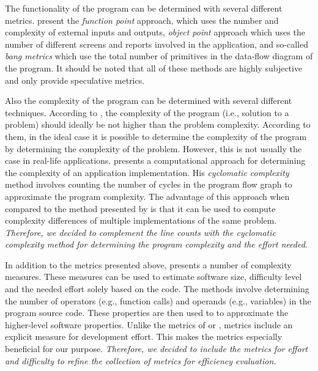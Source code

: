 The functionality of the program can be determined with several different metrics. \citet{fenton_software_1998} present the \emph{function point} approach, which uses the number and complexity of external inputs and outputs, \emph{object point} approach which uses the number of different screens and reports involved in the application, and so-called \emph{bang metrics} which use the total number of primitives in the data-flow diagram of the program. It should be noted that all of these methods are highly subjective and only provide speculative metrics.

Also the complexity of the program can be determined with several different techniques. According to \citet{fenton_software_1998}, the complexity of the program (i.e., solution to a problem) should ideally be not higher than the problem complexity. According to them, in the ideal case it is possible to determine the complexity of the program by determining the complexity of the problem. However, this is not usually the case in real-life applications. \citet{mccabe_complexity_1976} presents a computational approach for determining the complexity of an application implementation. His \emph{cyclomatic complexity} method involves counting the number of cycles in the program flow graph to approximate the program complexity. The advantage of this approach when compared to the method presented by \citet{fenton_software_1998} is that it can be used to compute complexity differences of multiple implementations of the same problem. \emph{Therefore, we decided to complement the line counts with the cyclomatic complexity method for determining the program complexity and the effort needed.}

In addition to the metrics presented above, \citet{halstead_elements_1977} presents a number of complexity measures. These measures can be used to estimate software size, difficulty level and the needed effort solely based on the code. The methods involve determining the number of operators (e.g., function calls) and operands (e.g., variables) in the program source code. These properties are then used to to approximate the higher-level software properties. Unlike the metrics of \citeauthor{mccabe_complexity_1976} or \citeauthor{fenton_software_1998}, \citeauthor{halstead_elements_1977} metrics include an explicit measure for development effort. This makes the metrics especially beneficial for our purpose. \emph{Therefore, we decided to include the \citeauthor{halstead_elements_1977} metrics for effort and difficulty to refine the collection of metrics for efficiency evaluation.}

